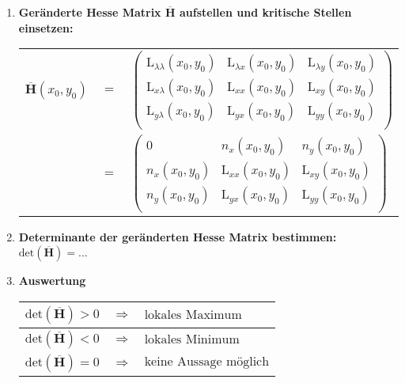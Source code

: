 \begin{enumerate}[itemsep=1ex]
    \item \textbf{Geränderte Hesse Matrix $\overline{\mathbf{H}}$ aufstellen und kritische Stellen einsetzen:}
    
    \begin{tabular}{lll}
        $\overline{\mathbf{H}}(x_0,y_0)$ &$=$&
        $\left(
            \begin{matrix}
                {{\mathrm{L}_{\lambda\lambda}(x_0, y_0)}}&{{\mathrm{L}_{\lambda x}(x_0, y_0)}}&{{\mathrm{L}_{\lambda y}(x_0, y_0)}}\\
                {{\mathrm{L}_{x\lambda}(x_0, y_0)}}&{{\mathrm{L}_{xx}(x_0, y_0)}}&{{\mathrm{L}_{xy}(x_0, y_0)}}\\
                {{\mathrm{L}_{y\lambda}(x_0, y_0)}}&{{\mathrm{L}_{yx}(x_0, y_0)}}&{{\mathrm{L}_{yy}(x_0, y_0)}}\\
            \end{matrix}
        \right)$\\
        &$=$&
        $\left(
            \begin{matrix}
                {{0}}&{{n_{x}(x_0, y_0)}}&{{n_{y}(x_0, y_0)}}\\
                {{n_{x}(x_0, y_0)}}&{{\mathrm{L}_{xx}(x_0, y_0)}}&{{\mathrm{L}_{xy}(x_0, y_0)}}\\
                {{n_{y}(x_0, y_0)}}&{{\mathrm{L}_{yx}(x_0, y_0)}}&{{\mathrm{L}_{yy}(x_0, y_0)}}\\
            \end{matrix}
        \right)$
        
    \end{tabular}


    \item \textbf{Determinante der geränderten Hesse Matrix bestimmen:}\\
    $\text{det}\left(\overline{\mathbf{H}}\right) = ... $

    \item \textbf{Auswertung}\\
    \begin{tabular}{lll}
        \hline
        $\text{det}\left(\overline{\mathbf{H}}\right) > 0$ &$\Longrightarrow$& $\text{lokales Maximum}$\\
        \hline
        $\text{det}\left(\overline{\mathbf{H}}\right) < 0$ &$\Longrightarrow$& $\text{lokales Minimum}$\\
        \hline
        $\text{det}\left(\overline{\mathbf{H}}\right) = 0$ &$\Longrightarrow$& $\text{keine Aussage möglich}$\\
        \hline
    \end{tabular}

\end{enumerate}

